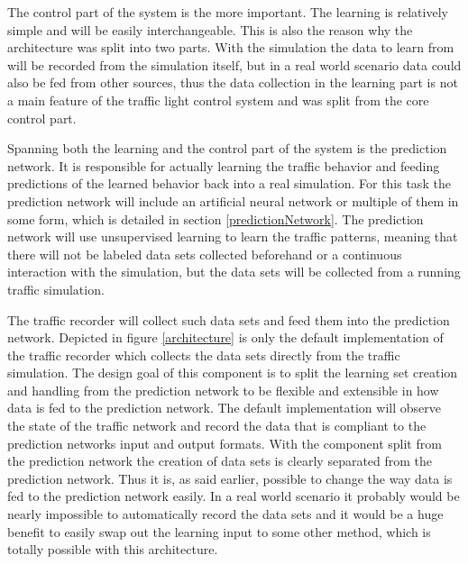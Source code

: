 The control part of the system is the more important. The learning is relatively simple and will be easily interchangeable. This is also the reason why the architecture was split into two parts. With the simulation the data to learn from will be recorded from the simulation itself, but in a real world scenario data could also be fed from other sources, thus the data collection in the learning part is not a main feature of the traffic light control system and was split from the core control part.

Spanning both the learning and the control part of the system is the prediction network. It is responsible for actually learning the traffic behavior and feeding predictions of the learned behavior back into a real simulation. For this task the prediction network will include an artificial neural network or multiple of them in some form, which is detailed in section \ref{predictionNetwork}. The prediction network will use unsupervised learning to learn the traffic patterns, meaning that there will not be labeled data sets collected beforehand or a continuous interaction with the simulation, but the data sets will be collected from a running traffic simulation.

The traffic recorder will collect such data sets and feed them into the prediction network. Depicted in figure \ref{architecture} is only the default implementation of the traffic recorder which collects the data sets directly from the traffic simulation. The design goal of this component is to split the learning set creation and handling from the prediction network to be flexible and extensible in how data is fed to the prediction network. The default implementation will observe the state of the traffic network and record the data that is compliant to the prediction networks input and output formats. With the component split from the prediction network the creation of data sets is clearly separated from the prediction network. Thus it is, as said earlier, possible to change the way data is fed to the prediction network easily. In a real world scenario it probably would be nearly impossible to automatically record the data sets and it would be a huge benefit to easily swap out the learning input to some other method, which is totally possible with this architecture.


